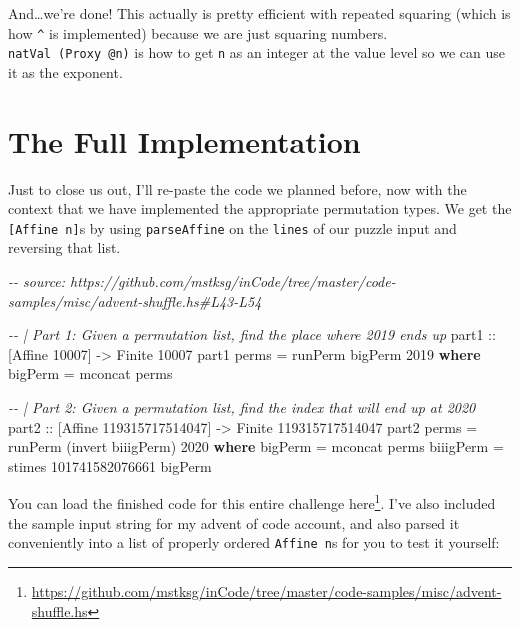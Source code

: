 \documentclass[]{article}
\newenvironment{Shaded}{}{}
\newcommand{\CommentTok}[1]{\textcolor[rgb]{0.38,0.63,0.69}{\textit{#1}}}
\newcommand{\DataTypeTok}[1]{\textcolor[rgb]{0.56,0.13,0.00}{#1}}
\newcommand{\DecValTok}[1]{\textcolor[rgb]{0.25,0.63,0.44}{#1}}
\newcommand{\FunctionTok}[1]{\textcolor[rgb]{0.02,0.16,0.49}{#1}}
\newcommand{\KeywordTok}[1]{\textcolor[rgb]{0.00,0.44,0.13}{\textbf{#1}}}
\newcommand{\NormalTok}[1]{#1}
\newcommand{\OtherTok}[1]{\textcolor[rgb]{0.00,0.44,0.13}{#1}}
\renewcommand{\href}[2]{#2\footnote{\url{#1}}}
\begin{document}
And\ldots we're done! This actually is pretty efficient with repeated squaring
(which is how \texttt{\^{}} is implemented) because we are just squaring
numbers. \texttt{natVal\ (Proxy\ @n)} is how to get \texttt{n} as an integer at
the value level so we can use it as the exponent.

\section{The Full Implementation}\label{the-full-implementation}

Just to close us out, I'll re-paste the code we planned before, now with the
context that we have implemented the appropriate permutation types. We get the
\texttt{{[}Affine\ n{]}}s by using \texttt{parseAffine} on the \texttt{lines} of
our puzzle input and reversing that list.

\begin{Shaded}
\begin{Highlighting}[]
\CommentTok{{-}{-} source: https://github.com/mstksg/inCode/tree/master/code{-}samples/misc/advent{-}shuffle.hs\#L43{-}L54}

\CommentTok{{-}{-} | Part 1: Given a permutation list, find the place where 2019 ends up}
\OtherTok{part1 ::}\NormalTok{ [}\DataTypeTok{Affine} \DecValTok{10007}\NormalTok{] }\OtherTok{{-}\textgreater{}} \DataTypeTok{Finite} \DecValTok{10007}
\NormalTok{part1 perms }\OtherTok{=}\NormalTok{ runPerm bigPerm }\DecValTok{2019}
  \KeywordTok{where}
\NormalTok{    bigPerm }\OtherTok{=} \FunctionTok{mconcat}\NormalTok{ perms}

\CommentTok{{-}{-} | Part 2: Given a permutation list, find the index that will end up at 2020}
\OtherTok{part2 ::}\NormalTok{ [}\DataTypeTok{Affine} \DecValTok{119315717514047}\NormalTok{] }\OtherTok{{-}\textgreater{}} \DataTypeTok{Finite} \DecValTok{119315717514047}
\NormalTok{part2 perms }\OtherTok{=}\NormalTok{ runPerm (invert biiigPerm) }\DecValTok{2020}
  \KeywordTok{where}
\NormalTok{    bigPerm   }\OtherTok{=} \FunctionTok{mconcat}\NormalTok{ perms}
\NormalTok{    biiigPerm }\OtherTok{=}\NormalTok{ stimes }\DecValTok{101741582076661}\NormalTok{ bigPerm}
\end{Highlighting}
\end{Shaded}

You can load the finished code for this entire challenge
\href{https://github.com/mstksg/inCode/tree/master/code-samples/misc/advent-shuffle.hs}{here}.
I've also included the sample input string for my advent of code account, and
also parsed it conveniently into a list of properly ordered \texttt{Affine\ n}s
for you to test it yourself:
\end{document}
